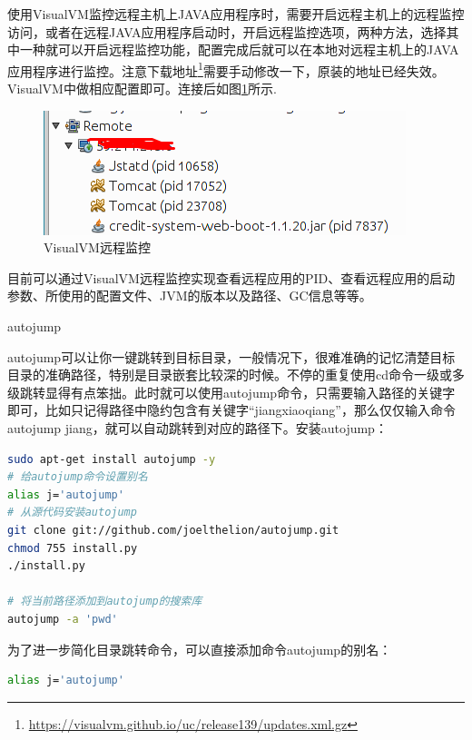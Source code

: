 \documentclass[11pt,fleqn]{book}
\makeatletter
\numberwithin{dummy}{section}
\theoremstyle{ocrenumbox}
\theoremstyle{blacknumex}
\theoremstyle{blacknumbox}
\theoremstyle{ocrenum}
\renewcommand{\subsection}{\@startsection {subsection}{2}{\z@}
	{-3ex \@plus -0.1ex \@minus -.4ex}
	{0.5ex \@plus.2ex }
	{\normalfont\sffamily\bfseries}}
\makeatother
\begin{document}
使用VisualVM监控远程主机上JAVA应用程序时，需要开启远程主机上的远程监控访问，或者在远程JAVA应用程序启动时，开启远程监控选项，两种方法，选择其中一种就可以开启远程监控功能，配置完成后就可以在本地对远程主机上的JAVA应用程序进行监控。注意下载地址\footnote{\url{https://visualvm.github.io/uc/release139/updates.xml.gz}}需要手动修改一下，原装的地址已经失效。VisualVM中做相应配置即可。连接后如图\ref{fig:visualvmconnectremote}所示.

\begin{figure}[htbp]
	\centering
	\includegraphics[scale=0.7]{visualvmconnectremote.png}
	\caption{VisualVM远程监控}
	\label{fig:visualvmconnectremote}
\end{figure}

目前可以通过VisualVM远程监控实现查看远程应用的PID、查看远程应用的启动参数、所使用的配置文件、JVM的版本以及路径、GC信息等等。


\subsection{autojump}

autojump可以让你一键跳转到目标目录，一般情况下，很难准确的记忆清楚目标目录的准确路径，特别是目录嵌套比较深的时候。不停的重复使用cd命令一级或多级跳转显得有点笨拙。此时就可以使用autojump命令，只需要输入路径的关键字即可，比如只记得路径中隐约包含有关键字“jiangxiaoqiang”，那么仅仅输入命令autojump jiang，就可以自动跳转到对应的路径下。安装autojump：

\begin{lstlisting}[language=Bash]
sudo apt-get install autojump -y
# 给autojump命令设置别名
alias j='autojump'
# 从源代码安装autojump
git clone git://github.com/joelthelion/autojump.git
chmod 755 install.py
./install.py

# 将当前路径添加到autojump的搜索库
autojump -a 'pwd'
\end{lstlisting}

为了进一步简化目录跳转命令，可以直接添加命令autojump的别名：

\begin{lstlisting}[language=Bash]
alias j='autojump'
\end{lstlisting}
\end{document}
